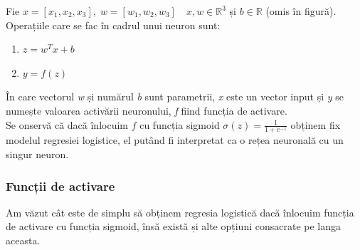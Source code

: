 Fie $x=[x_1,x_2,x_3], \; w=[w_1,w_2,w_3] \quad x,w \in \mathbb{R}^3$ și $b \in \mathbb{R}$ (omis în figură). Operațiile care se fac în cadrul unui neuron sunt:

\begin{enumerate}
\centering
\item $z=w^Tx + b$
\item $y=f(z)$
\end{enumerate}

În care vectorul \textit{w} și numărul \textit{b} sunt parametrii, \textit{x} este un vector input și \textit{y} se numește valoarea activării neuronului, \textit{f} fiind funcția de activare. \\
Se onservă că dacă înlocuim $f$ cu funcția sigmoid $\displaystyle{\sigma(z)=\frac{1}{1 + e^{-z}}}$ obținem fix modelul regresiei logistice, el putând fi interpretat ca o rețea neuronală cu un singur neuron.

\subsubsection{Funcții de activare}
Am văzut cât este de simplu să obținem regresia logistică dacă înlocuim funcția de activare cu funcția sigmoid, însă există și alte opțiuni consacrate pe langa aceasta.

